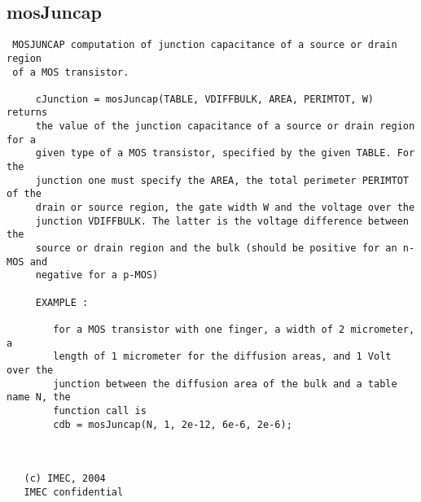 \subsection{mosJuncap}
\label{sec:mosJuncap}
\begin{verbatim}
 MOSJUNCAP computation of junction capacitance of a source or drain region 
 of a MOS transistor.
 
     cJunction = mosJuncap(TABLE, VDIFFBULK, AREA, PERIMTOT, W) returns
     the value of the junction capacitance of a source or drain region for a
     given type of a MOS transistor, specified by the given TABLE. For the
     junction one must specify the AREA, the total perimeter PERIMTOT of the
     drain or source region, the gate width W and the voltage over the
     junction VDIFFBULK. The latter is the voltage difference between the
     source or drain region and the bulk (should be positive for an n-MOS and 
     negative for a p-MOS) 
 
     EXAMPLE :
 
        for a MOS transistor with one finger, a width of 2 micrometer, a
        length of 1 micrometer for the diffusion areas, and 1 Volt over the
        junction between the diffusion area of the bulk and a table name N, the
        function call is
        cdb = mosJuncap(N, 1, 2e-12, 6e-6, 2e-6);
 
 
 
   (c) IMEC, 2004
   IMEC confidential 
 

\end{verbatim}

\newpage
